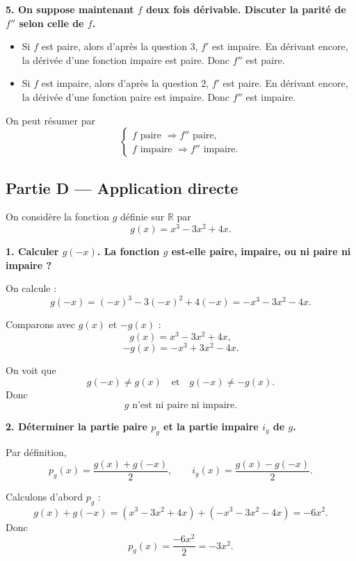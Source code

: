\documentclass[11pt,a4paper]{article}
\newcommand{\R}{\mathbb{R}}
\begin{document}
\bigskip

\textbf{5. On suppose maintenant \(f\) deux fois dérivable. Discuter la parité de \(f''\) selon celle de \(f\).}

\begin{itemize}[label=\(\bullet\)]
    \item Si \(f\) est paire, alors d'après la question 3, \(f'\) est impaire. En dérivant encore, la dérivée d'une fonction impaire est paire. Donc \(f''\) est paire.
    
    \item Si \(f\) est impaire, alors d'après la question 2, \(f'\) est paire. En dérivant encore, la dérivée d'une fonction paire est impaire. Donc \(f''\) est impaire.
\end{itemize}

On peut résumer par
\[
\boxed{
\begin{cases}
f \text{ paire } \Longrightarrow f'' \text{ paire},\\[0.3em]
f \text{ impaire } \Longrightarrow f'' \text{ impaire}.
\end{cases}}
\]

\bigskip

\subsection*{Partie D --- Application directe}

On considère la fonction \(g\) définie sur \(\R\) par
\[
g(x)=x^3-3x^2+4x.
\]

\textbf{1. Calculer \(g(-x)\). La fonction \(g\) est-elle paire, impaire, ou ni paire ni impaire ?}

On calcule :
\[
g(-x)=(-x)^3-3(-x)^2+4(-x)=-x^3-3x^2-4x.
\]

Comparons avec \(g(x)\) et \(-g(x)\) :
\[
g(x)=x^3-3x^2+4x,
\]
\[
-g(x)=-x^3+3x^2-4x.
\]

On voit que
\[
g(-x)\neq g(x)
\quad \text{et} \quad
g(-x)\neq -g(x).
\]
Donc
\[
\boxed{g \text{ n'est ni paire ni impaire.}}
\]

\bigskip

\textbf{2. Déterminer la partie paire \(p_g\) et la partie impaire \(i_g\) de \(g\).}

Par définition,
\[
p_g(x)=\frac{g(x)+g(-x)}{2},
\qquad
i_g(x)=\frac{g(x)-g(-x)}{2}.
\]

Calculons d'abord \(p_g\) :
\[
g(x)+g(-x)
=(x^3-3x^2+4x)+(-x^3-3x^2-4x)
=-6x^2.
\]
Donc
\[
p_g(x)=\frac{-6x^2}{2}=-3x^2.
\]
\end{document}
